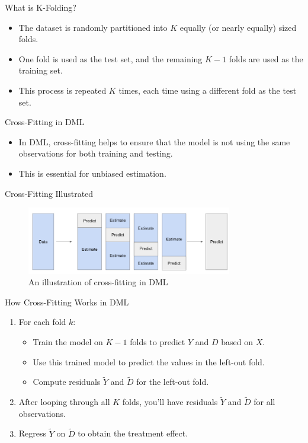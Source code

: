 \documentclass{beamer}
\begin{document}
\begin{frame}{What is K-Folding?}
  \begin{itemize}
    \item The dataset is randomly partitioned into \( K \) equally (or nearly equally) sized folds.
    \item One fold is used as the test set, and the remaining \( K-1 \) folds are used as the training set.
    \item This process is repeated \( K \) times, each time using a different fold as the test set.
  \end{itemize}
\end{frame}

\begin{frame}{Cross-Fitting in DML}
  \begin{itemize}
    \item In DML, cross-fitting helps to ensure that the model is not using the same observations for both training and testing.
    \item This is essential for unbiased estimation.
  \end{itemize}
\end{frame}

\begin{frame}{Cross-Fitting Illustrated}
  \begin{figure}
    \centering
    \includegraphics[width=0.8\textwidth]{./lecture_includes/facure-cross-prediction.png}
    \caption{An illustration of cross-fitting in DML}
  \end{figure}
\end{frame}



\begin{frame}{How Cross-Fitting Works in DML}
  \begin{enumerate}
    \item For each fold \( k \):
      \begin{itemize}
        \item Train the model on \( K-1 \) folds to predict \( Y \) and \( D \) based on \( X \).
        \item Use this trained model to predict the values in the left-out fold.
        \item Compute residuals \( \tilde{Y} \) and \( \tilde{D} \) for the left-out fold.
      \end{itemize}
    \item After looping through all \( K \) folds, you'll have residuals \( \tilde{Y} \) and \( \tilde{D} \) for all observations.
    \item Regress \( \tilde{Y} \) on \( \tilde{D} \) to obtain the treatment effect.
  \end{enumerate}
\end{frame}
\end{document}
